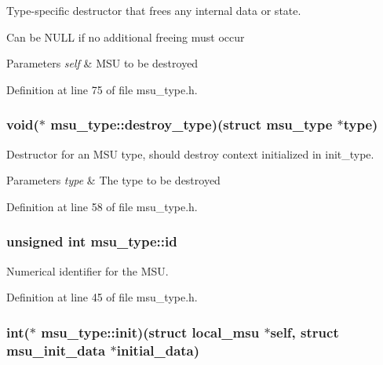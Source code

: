 Type-\/specific destructor that frees any internal data or state. 

Can be N\-U\-L\-L if no additional freeing must occur 
\begin{DoxyParams}{Parameters}
{\em self} & M\-S\-U to be destroyed \\
\hline
\end{DoxyParams}


Definition at line 75 of file msu\-\_\-type.\-h.

\hypertarget{structmsu__type_a4386613c175f4fa42c1ae5b5027246ce}{
\subsubsection[{destroy\-\_\-type}]{\setlength{\rightskip}{0pt plus 5cm}void($\ast$ msu\-\_\-type\-::destroy\-\_\-type)(struct {\bf msu\-\_\-type} $\ast$type)}}\label{structmsu__type_a4386613c175f4fa42c1ae5b5027246ce}


Destructor for an M\-S\-U type, should destroy context initialized in {\ttfamily init\-\_\-type}. 


\begin{DoxyParams}{Parameters}
{\em type} & The type to be destroyed \\
\hline
\end{DoxyParams}


Definition at line 58 of file msu\-\_\-type.\-h.

\hypertarget{structmsu__type_a0d626321555fed55c525a480dee99b83}{
\subsubsection[{id}]{\setlength{\rightskip}{0pt plus 5cm}unsigned int msu\-\_\-type\-::id}}\label{structmsu__type_a0d626321555fed55c525a480dee99b83}


Numerical identifier for the M\-S\-U. 



Definition at line 45 of file msu\-\_\-type.\-h.

\hypertarget{structmsu__type_af17ea5ed6d4071e62d80f545139fb425}{
\subsubsection[{init}]{\setlength{\rightskip}{0pt plus 5cm}int($\ast$ msu\-\_\-type\-::init)(struct {\bf local\-\_\-msu} $\ast$self, struct {\bf msu\-\_\-init\-\_\-data} $\ast$initial\-\_\-data)}}\label{structmsu__type_af17ea5ed6d4071e62d80f545139fb425}


